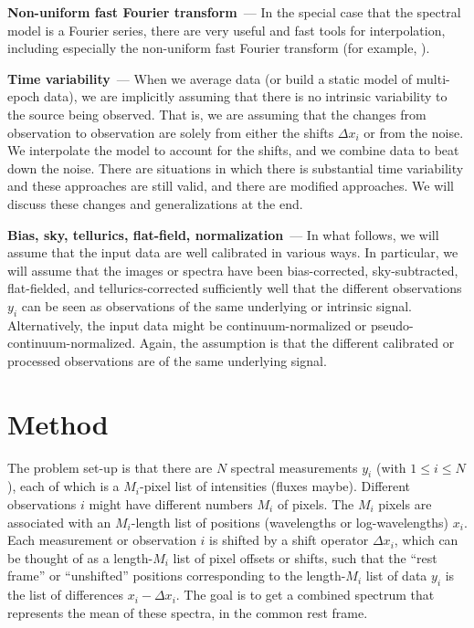 \documentclass[11pt]{article}
\renewcommand{\paragraph}[1]{\medskip\par\noindent\textbf{#1}~---}
\begin{document}
\paragraph{Non-uniform fast Fourier transform}
In the special case that the spectral model is a Fourier series, there are very useful and fast tools for interpolation, including especially the non-uniform fast Fourier transform (for example, \cite{finufft}).

\paragraph{Time variability}
When we average data (or build a static model of multi-epoch data), we are implicitly assuming that there is no intrinsic variability to the source being observed.
That is, we are assuming that the changes from observation to observation are solely from either the shifts $\Delta x_i$ or from the noise.
We interpolate the model to account for the shifts, and we combine data to beat down the noise.
There are situations in which there is substantial time variability and these approaches are still valid, and there are modified approaches.
We will discuss these changes and generalizations at the end.

\paragraph{Bias, sky, tellurics, flat-field, normalization}
In what follows, we will assume that the input data are well calibrated in various ways.
In particular, we will assume that the images or spectra have been bias-corrected, sky-subtracted, flat-fielded, and tellurics-corrected sufficiently well that the different observations $y_i$ can be seen as observations of the same underlying or intrinsic signal.
Alternatively, the input data might be continuum-normalized or pseudo-continuum-normalized.
Again, the assumption is that the different calibrated or processed observations are of the same underlying signal.

\section{Method}\label{sec:method}

The problem set-up is that there are $N$ spectral measurements $y_i$ (with $1\leq i\leq N$), each of which is a $M_i$-pixel list of intensities (fluxes maybe).
Different observations $i$ might have different numbers $M_i$ of pixels.
The $M_i$ pixels are associated with an $M_i$-length list of positions (wavelengths or log-wavelengths) $x_i$.
Each measurement or observation $i$ is shifted by a shift operator $\Delta x_i$, which can be thought of as a length-$M_i$ list of pixel offsets or shifts, such that the ``rest frame'' or ``unshifted'' positions corresponding to the length-$M_i$ list of data $y_i$ is the list of differences $x_i - \Delta x_i$.
The goal is to get a combined spectrum that represents the mean of these spectra, in the common rest frame.
\end{document}
